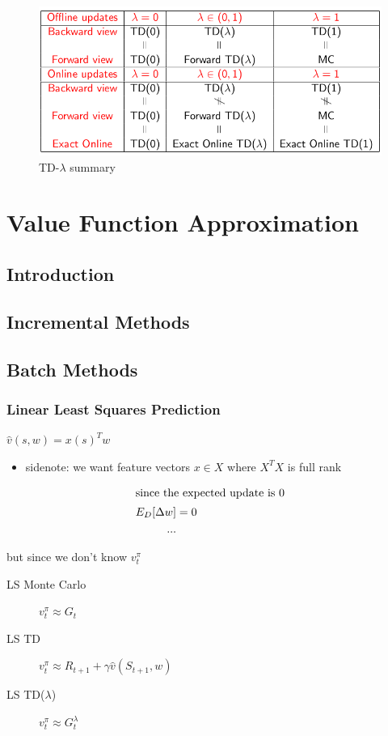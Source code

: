 \documentclass[]{article}
\theoremstyle{definition}
\begin{document}
\begin{figure}[ht]
    \centering
    \includegraphics[width=0.5\linewidth]{td-lambda-summary.png}
    \caption{TD-$\lambda$ summary}
    \label{fig:td-lambda-summary}
\end{figure}

\section{Value Function Approximation}%
\label{sec:value_function_approximation}

\subsection{Introduction}%
\label{sub:introduction}

\subsection{Incremental Methods}%
\label{sub:_incremental_methods}

\subsection{Batch Methods}%
\label{sub:batch_methods}

\subsubsection{Linear Least Squares Prediction}%
\label{ssub:linear_least_squares_prediction}

$\hat v(s,w) = x(s)^Tw$
\begin{itemize}
    \item sidenote: we want feature vectors $x \in X$ where $X^TX$ is full rank
\end{itemize}

\begin{align*}
    \intertext{since the expected update is 0}
    E_D[\Delta w] &= 0 \\
    ...
\end{align*}

but since we don't know $v^\pi_t$
\begin{description}
    \item[LS Monte Carlo] $v^\pi_t \approx G_t$
    \item[LS TD] $v^\pi_t \approx R_{t+1} + \gamma \hat v(S_{t+1},w)$
    \item[LS TD($\lambda$)] $v^\pi_t \approx G_t^\lambda$
\end{description}
\end{document}
